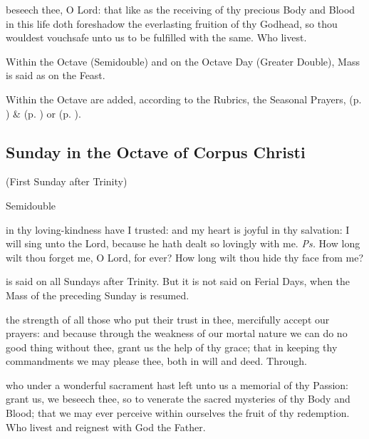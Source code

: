 \postcommunion
{} beseech thee, O Lord: that like as the receiving of thy precious Body and Blood in this life doth foreshadow the everlasting fruition of thy Godhead, so thou wouldest vouchsafe unto us to be fulfilled with the same. Who livest.
\begin{rubric}
    Within the Octave (Semidouble) and on the Octave Day (Greater Double), Mass is said as on the Feast.
\end{rubric}
\begin{rubric}
    Within the Octave are added, according to the Rubrics, the Seasonal Prayers,   (p. \pageref{SPMaryInEaster}) \&   (p. \pageref{SPAgainst}) or  (p. \pageref{SPChiefBishop}).
\end{rubric}

\clearpage
\subsection{Sunday in the Octave of Corpus Christi}
\centerline{\small{(First Sunday after Trinity)}}
\begin{inhead}
    {Semidouble}
\end{inhead}


\vspace{-0.25\baselineskip}

\introit
{} in thy loving-kindness have I trusted: and my heart is joyful in thy salvation: I will sing unto the Lord, because he hath dealt so lovingly with me. \textit{Ps.} How long wilt thou forget me, O Lord, for ever? How long wilt thou hide thy face from me?
\begin{rubric}
     is said on all Sundays after Trinity. But it is not said on Ferial Days, when the Mass of the preceding Sunday is resumed.
\end{rubric}

\collect
{} the strength of all those who put their trust in thee, mercifully accept our prayers: and because through the weakness of our mortal nature we can do no good thing without thee, grant us the help of thy grace; that in keeping thy commandments we may please thee, both in will and deed. Through.

 who under a wonderful sacrament hast left unto us a memorial of thy Passion: grant us, we beseech thee, so to venerate the sacred mysteries of thy Body and Blood; that we may ever perceive within ourselves the fruit of thy redemption. Who livest and reignest with God the Father.

